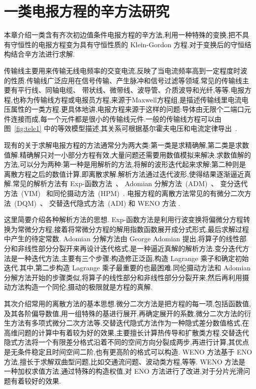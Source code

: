 \chapter{一类电报方程的辛方法研究}

本章介绍一类含有齐次初边值条件电报方程的辛方法,利用一种特殊的变换,把不具有守恒性的电报方程变为具有守恒性质的 Klein-Gordon 方程.对于变换后的守恒结构结合辛方法进行求解.

传输线主要用来传输无线电频率的交变电流,反映了当电流频率高到一定程度时波的性质.传输线广泛应用在信号传输、产生脉冲和信号过滤等领域.常见的传输线主要有平行线、同轴电缆、
带状线、微带线、波导管、介质波导和光纤,等等.电报方程,也称为传输线方程或电报员方程,来源于Maxwell方程组,是描述传输线里电流电压属性的一类方程.更具体地讲,电报方程来源于这样的问题:导体由无限个二端口元件连接而成,每一个元件都是很小的传输线元件.一般的传输线方程可以由图~\ref{fig:tele1} 中的等效模型描述,其关系可根据基尔霍夫电压和电流定律导出~\cite{ludwig2000rf}.

现有的关于求解电报方程的方法通常分为两大类:第一类是求精确解,第二类是求数值解.精确解只对一小部分方程有效,大量问题还需要用数值模拟来解决.求数值解的方法,可以分为两种:第一种是用解析的方法,将解的波形迭代起来求解;第二种则是离散方程之后的数值计算,即离散求解.解析方法通过迭代波形,使得结果逐渐逼近真解.常见的解析方法有 Exp-函数方法~\cite{naher2011exp}、 Adomian 分解方法~(ADM)~\cite{adomian1988areview,sheikholeslami2012analytical}、 变分迭代方法~(VIM)~\cite{wu2013variational} 和同伦摄动方法~(HPM)~\cite{sheikholeslami2012homotopy}. 电报方程的离散方法常见的有微分二次方法~(DQM)~\cite{jiwari2012numerical}、 交替迭代隐式方法~(ADI) \cite{cui2013convergence} 和 WENO 方法 \cite{borges2008improved,shen2014improvement}.

这里简要介绍各种解析方法的思想. Exp-函数方法是利用行波变换将偏微分方程转换为常微分方程,接着将常微分方程的解用指数函数展开成分式形式,最后求解过程中产生的待定常数. Adomian 分解方法由 George Adomian 提出,将算子的线性部分和非线性部分分裂开来再设计迭代格式,是一种逼近真解的解析方法.变分迭代方法是一种迭代方法,主要有三个步骤:构造修正泛函,构造 Lagrange 乘子和确定初始迭代.其中,第二步构造 Lagrange 乘子最重要的也最困难.同伦摄动方法和 Adomian 分解方法开始的步骤类似,将算子的线性部分和非线性部分分裂开来,然后再利用摄动方法构造一个同伦,摄动的极限就是方程的真解.

其次介绍常用的离散方法的基本思想.微分二次方法是把方程的每一项,包括函数值,及其各阶偏导数值,用一组特殊的基进行展开,再确定展开的系数,微分二次方法的衍生方法有多项式微分二次方法等.交替迭代隐式方法作为一种隐式差分数值格式,在高维问题的计算中有着较为好的效果,主要擅长计算热传导和扩散类方程.交替迭代隐式方法将一个有限差分格式沿着不同的空间方向分裂成两步,再进行计算,其优点是无条件稳定且时间空间二阶,也有更高阶的格式可以构造. WENO 方法基于 ENO 方法,擅长于求解双曲型问题,比如交通流问题、波动类方程,等等. WENO 方法是一种加权求值方法,通过特殊的构造权值,对 ENO 方法进行了改进,对于分片光滑问题有着较好的效果.

